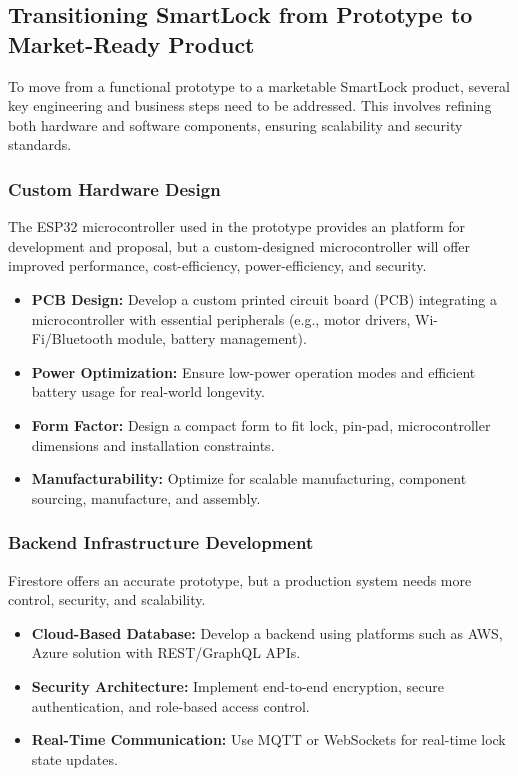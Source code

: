 \subsection{Transitioning SmartLock from Prototype to Market-Ready Product}

To move from a functional prototype to a marketable SmartLock product, several key engineering and business steps need to be addressed. This involves refining both hardware and software components, ensuring scalability and security standards.

\subsubsection{Custom Hardware Design}

The ESP32 microcontroller used in the prototype provides an platform for development and proposal, but a custom-designed microcontroller will offer improved performance, cost-efficiency, power-efficiency, and security.

\begin{itemize}
  \item \textbf{PCB Design:} Develop a custom printed circuit board (PCB) integrating a microcontroller with essential peripherals (e.g., motor drivers, Wi-Fi/Bluetooth module, battery management).
  \item \textbf{Power Optimization:} Ensure low-power operation modes and efficient battery usage for real-world longevity.
  \item \textbf{Form Factor:} Design a compact form to fit lock, pin-pad, microcontroller dimensions and installation constraints.
  \item \textbf{Manufacturability:} Optimize for scalable manufacturing, component sourcing, manufacture, and assembly.
\end{itemize}

\subsubsection{Backend Infrastructure Development}

Firestore offers an accurate prototype, but a production system needs more control, security, and scalability.

\begin{itemize}
  \item \textbf{Cloud-Based Database:} Develop a backend using platforms such as AWS, Azure solution with REST/GraphQL APIs.
  \item \textbf{Security Architecture:} Implement end-to-end encryption, secure authentication, and role-based access control.
  \item \textbf{Real-Time Communication:} Use MQTT or WebSockets for real-time lock state updates.
\end{itemize}

